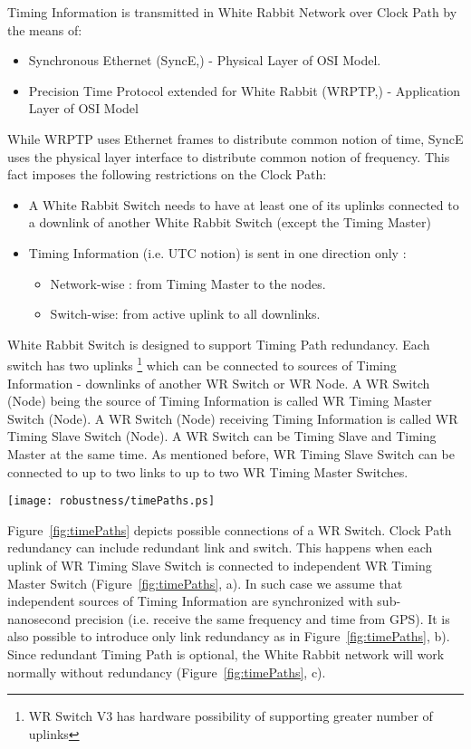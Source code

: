 Timing Information is transmitted in White Rabbit Network over Clock Path by
the means of:
\begin{itemize}
  \item Synchronous Ethernet (SyncE,\cite{SynchE}) - Physical Layer of OSI
Model.
  \item Precision Time Protocol \cite{IEEE1588} extended for White Rabbit
(WRPTP,\cite{WRPTP}) - Application Layer of OSI Model
\end{itemize}
While WRPTP uses Ethernet frames to distribute common notion of time, SyncE
uses the physical layer interface to distribute common notion of frequency. This
fact imposes the following restrictions on the Clock Path:
\begin{itemize}
  \item A White Rabbit Switch needs to have at least one of its uplinks
connected to a downlink of another White Rabbit Switch (except the Timing
Master)
  \item Timing Information (i.e. UTC notion) is sent in one direction only : 
    \begin{itemize}
      \item Network-wise : from Timing Master to the nodes.
      \item Switch-wise: from active uplink to all downlinks.
    \end{itemize}
\end{itemize}

White Rabbit Switch is designed to support Timing Path redundancy. Each switch
has two uplinks \footnote{WR Switch V3 has hardware possibility of supporting
greater number of uplinks} which can be connected to sources of Timing
Information - downlinks of another WR Switch or WR Node. A WR Switch (Node)
being the source of Timing Information is called WR Timing Master Switch (Node).
A WR Switch (Node) receiving Timing Information is called WR Timing Slave Switch
(Node). A WR Switch can be Timing Slave and Timing Master at the same time. As
mentioned before, WR Timing Slave Switch can be connected to up to two links
to up to two WR Timing Master Switches.

\begin{center}
	\texttt{[image: robustness/timePaths.ps]}
	\label{fig:timePaths}
\end{center}

Figure~\ref{fig:timePaths} depicts possible connections of a WR Switch. Clock
Path redundancy can include redundant link and switch. This happens when each
uplink of WR Timing Slave Switch is connected to independent WR Timing Master
Switch (Figure~\ref{fig:timePaths}, a). In such case we assume that independent
sources of Timing Information are synchronized with sub-nanosecond precision 
(i.e. receive the same frequency and time from GPS). It is also possible to
introduce only link redundancy as in Figure~\ref{fig:timePaths}, b). Since
redundant Timing Path is optional, the
White Rabbit network will work normally without redundancy
(Figure~\ref{fig:timePaths}, c).


